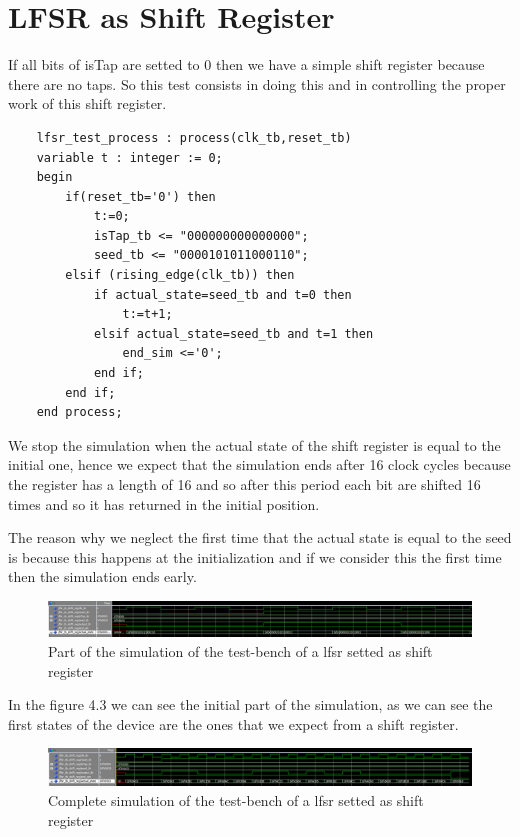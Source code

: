 \documentclass[a4paper]{report}
\begin{document}
\section{LFSR as Shift Register}
If all bits of isTap are setted to 0 then we have a simple shift register because there are no taps. So this test consists in doing this and in controlling the proper work of this shift register.

\begin{lstlisting}
	lfsr_test_process : process(clk_tb,reset_tb)
	variable t : integer := 0;
	begin
		if(reset_tb='0') then
			t:=0;
			isTap_tb <= "000000000000000";
			seed_tb <= "0000101011000110";
		elsif (rising_edge(clk_tb)) then
			if actual_state=seed_tb and t=0 then
				t:=t+1;
			elsif actual_state=seed_tb and t=1 then
				end_sim <='0';
			end if;
		end if;
	end process;
\end{lstlisting}
We stop the simulation when the actual state of the shift register is equal to the initial one, hence we expect that the simulation ends after 16 clock cycles because the register has a length of 16 and so after this period each bit are shifted 16 times and so it has returned in the initial position.

\noindent The reason why we neglect the first time that the actual state is equal to the seed is because this happens at the initialization and if we consider this the first time then the simulation ends early.

\begin{figure}[htpb]
	\centering
	\includegraphics[width=.6\textheight, height=.1\textheight]{img/tb/wave_lfsr_as_shift_reg_test_bin.png}
	\caption{Part of the simulation of the test-bench of a lfsr setted as shift register}
\end{figure}

\noindent In the figure 4.3 we can see the initial part of the simulation, as we can see the first states of the device are the ones that we expect from a shift register.

\begin{figure}[htpb]
	\centering
	\includegraphics[width=.6\textheight, height=.1\textheight]{img/tb/wave_lfsr_as_shift_reg_test_hex.png}
	\caption{Complete simulation of the test-bench of a lfsr setted as shift register}
\end{figure}
\end{document}
